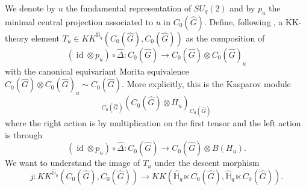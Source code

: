 \documentclass[a4paper, 11pt]{amsart}
\theoremstyle{plain}
\theoremstyle{definition}
\theoremstyle{remark}
\DeclareMathOperator{\id}{id}
\newcommand{\D}{\Delta}
\newcommand{\HH}{\mathbb{H}}
\begin{document}
We denote by $u$ the fundamental representation of $SU_{q}(2)$ and by $p_{u}$ the minimal central projection associated to $u$ in $C_{0}(\widehat{G})$. Define, following \cite{voigt2011baum}, a KK-theory element $T_{u}\in KK^{\widehat{\HH}_{q}}(C_{0}(\widehat{G}), C_{0}(\widehat{G}))$ as the composition of
\begin{equation*}
(\id\otimes p_{u})\circ\widehat{\D} : C_{0}(\widehat{G})\to C_{0}(\widehat{G})\otimes C_{0}(\widehat{G})_{u}
\end{equation*}
with the canonical equivariant Morita equivalence $C_{0}(\widehat{G})\otimes C_{0}(\widehat{G})_{u}\sim C_{0}(\widehat{G})$. More explicitly, this is the Kasparov module
\begin{equation*}
{}_{C_{0}(\widehat{G})}\left(C_{0}(\widehat{G})\otimes H_{u}\right)_{C_{0}(\widehat{G})}
\end{equation*}
where the right action is by multiplication on the first tensor and the left action is through
\begin{equation*}
(\id\otimes p_{u})\circ\widehat{\D} : C_{0}(\widehat{G})\to C_{0}(\widehat{G})\otimes B(H_{u}).
\end{equation*}
We want to understand the image of $T_{u}$ under the descent morphism
\begin{equation*}
j : KK^{\widehat{\HH}_{q}}(C_{0}(\widehat{G}), C_{0}(\widehat{G}))\to KK(\widehat{\HH}_{q}\ltimes C_{0}(\widehat{G}), \widehat{\HH}_{q}\ltimes C_{0}(\widehat{G})).
\end{equation*}
\end{document}
